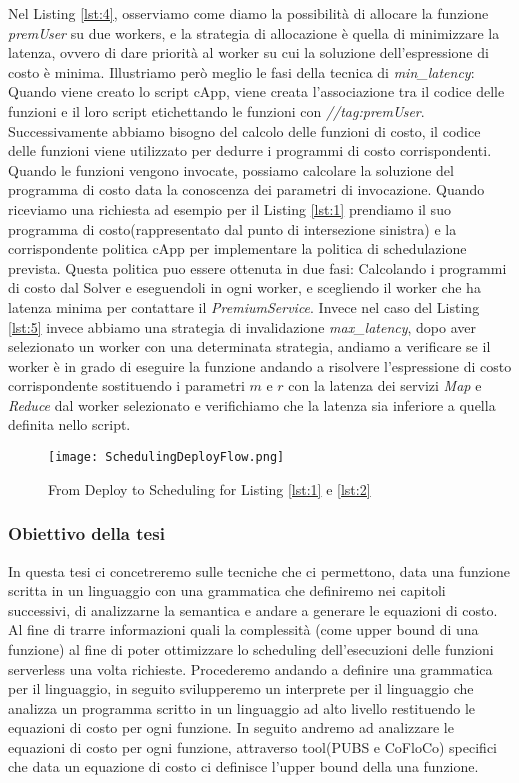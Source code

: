 \documentclass[../../main.tex]{subfiles}
\begin{document}
Nel Listing \ref{lst:4}, osserviamo come diamo la possibilità di allocare la funzione \textit{premUser} su due workers, e la strategia di allocazione è quella di minimizzare la latenza, ovvero di dare priorità al worker su cui la soluzione dell'espressione di costo è minima.
Illustriamo però meglio le fasi della tecnica di \textit{min\_latency}:
Quando viene creato lo script cApp, viene creata l'associazione tra il codice delle funzioni e il loro script etichettando le funzioni con \textit{//tag:premUser}.
Successivamente abbiamo bisogno del calcolo delle funzioni di costo, il codice delle funzioni viene utilizzato per dedurre i programmi di costo corrispondenti.
Quando le funzioni vengono invocate, possiamo calcolare la soluzione del programma di costo data la conoscenza dei parametri di invocazione.
Quando riceviamo una richiesta ad esempio per il Listing \ref{lst:1} prendiamo il suo programma di costo(rappresentato dal punto di intersezione sinistra) e la corrispondente politica cApp per implementare la politica di schedulazione prevista.
Questa politica puo essere ottenuta in due fasi: Calcolando i programmi di costo dal Solver e eseguendoli in ogni worker, e scegliendo il worker che ha latenza minima per contattare il \textit{PremiumService}.
Invece nel caso del Listing \ref{lst:5} invece abbiamo una strategia di invalidazione \textit{max\_latency}, dopo aver selezionato un worker con una determinata strategia, andiamo a verificare se il worker è in grado di eseguire la funzione andando a risolvere l'espressione di costo corrispondente sostituendo i parametri $m$ e $r$ con la latenza dei servizi \textit{Map} e \textit{Reduce} dal worker selezionato e verifichiamo che la latenza sia inferiore a quella definita nello script.\autocite{deserverless}\\
\begin{figure}[H]
    \texttt{[image: SchedulingDeployFlow.png]}
    \centering
    \caption{From Deploy to Scheduling for Listing \ref{lst:1} e \ref{lst:2} }
\end{figure}
\newpage
\subsubsection{Obiettivo della tesi}

In questa tesi ci concetreremo sulle tecniche che ci permettono, data una funzione scritta in un linguaggio con una grammatica che definiremo nei capitoli successivi, di analizzarne la semantica e andare a generare le equazioni di costo.
Al fine di trarre informazioni quali la complessità (come upper bound di una funzione) al fine di poter ottimizzare lo scheduling dell'esecuzioni delle funzioni serverless una volta richieste.
Procederemo andando a definire una grammatica per il linguaggio, in seguito svilupperemo un interprete per il linguaggio che analizza un programma scritto in un linguaggio ad alto livello restituendo le equazioni di costo per ogni funzione.
In seguito andremo ad analizzare le equazioni di costo per ogni funzione, attraverso tool(PUBS \autocite{albert2008automatic} e CoFloCo\autocite{flores2014resource}) specifici che data un equazione di costo ci definisce l'upper bound della una funzione.
\end{document}
